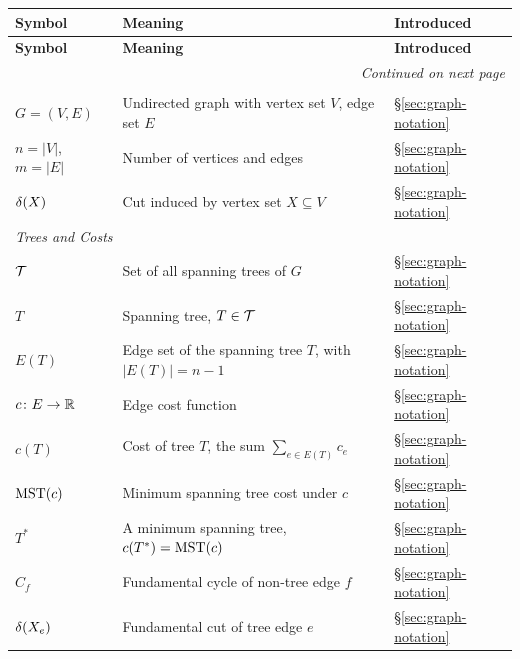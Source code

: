 \begin{longtable}{@{}l>{\raggedright\arraybackslash}p{}l@{}}
\toprule
\textbf{Symbol} & \textbf{Meaning} & \textbf{Introduced} \\
\midrule
\endfirsthead

\toprule
\textbf{Symbol} & \textbf{Meaning} & \textbf{Introduced} \\
\midrule
\endhead

\midrule
\multicolumn{3}{r}{\textit{Continued on next page}} \\
\endfoot

\bottomrule
\endlastfoot

\multicolumn{3}{l}{\textit{Graph Notation}} \\
$G = (V, E)$ & Undirected graph with vertex set $V$, edge set $E$ & \S\ref{sec:graph-notation} \\
$n = |V|$, $m = |E|$ & Number of vertices and edges & \S\ref{sec:graph-notation} \\
$\delta(X)$ & Cut induced by vertex set $X \subseteq V$ & \S\ref{sec:graph-notation} \\
\midrule

\multicolumn{3}{l}{\textit{Trees and Costs}} \\
$\mathcal{T}$ & Set of all spanning trees of $G$ & \S\ref{sec:graph-notation} \\
$T$ & Spanning tree, $T \in \mathcal{T}$ & \S\ref{sec:graph-notation} \\
$E(T)$ & Edge set of the spanning tree $T$, with $|E(T)| = n - 1$ & \S\ref{sec:graph-notation} \\
$c \colon E \to \mathbb{R}$ & Edge cost function & \S\ref{sec:graph-notation} \\
$c(T)$ & Cost of tree $T$, the sum $\sum_{e \in E(T)} c_e$ & \S\ref{sec:graph-notation} \\
$\mathrm{MST}(c)$ & Minimum spanning tree cost under $c$ & \S\ref{sec:graph-notation} \\
$T^*$ & A minimum spanning tree, $c(T^*) = \mathrm{MST}(c)$ & \S\ref{sec:graph-notation} \\
$C_f$ & Fundamental cycle of non-tree edge $f$ & \S\ref{sec:graph-notation} \\
$\delta(X_e)$ & Fundamental cut of tree edge $e$ & \S\ref{sec:graph-notation} \\
\midrule


\end{longtable}
